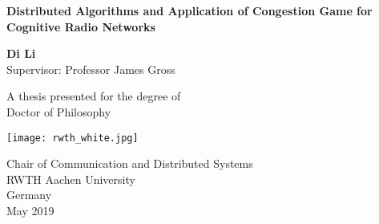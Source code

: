 


\begin{titlepage}
    \begin{center}
        \vspace*{1cm}
        
        \Huge
        \textbf{Distributed Algorithms and Application of Congestion Game for Cognitive Radio Networks}
        
        
        \vspace{1.5cm}
        
        \textbf{Di Li}\\
        \vspace{.5cm}
        \LARGE
        Supervisor: Professor James Gross
        
        \vfill
        
        A thesis presented for the degree of\\
        Doctor of Philosophy
        
        \vspace{0.8cm}
        
        \texttt{[image: rwth\_white.jpg]}
        
        \Large
        Chair of Communication and Distributed Systems\\
        RWTH Aachen University\\
        Germany\\
        May 2019
        \vspace{1.5cm}
        
    \end{center}
\end{titlepage}